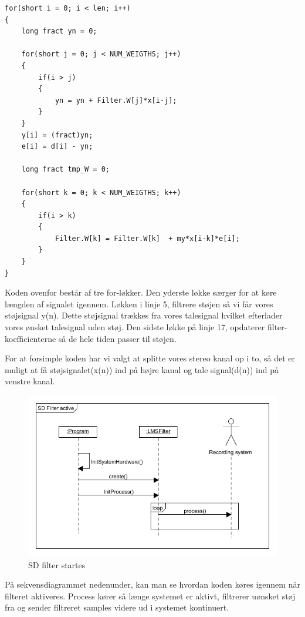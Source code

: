 \newpage


\begin{lstlisting}
for(short i = 0; i < len; i++)
{
	long fract yn = 0;

	for(short j = 0; j < NUM_WEIGTHS; j++)
	{
		if(i > j)
		{
			yn = yn + Filter.W[j]*x[i-j];
		}
	}
	y[i] = (fract)yn;
	e[i] = d[i] - yn;
		
	long fract tmp_W = 0;
		
	for(short k = 0; k < NUM_WEIGTHS; k++)
	{
		if(i > k)
		{
			Filter.W[k] = Filter.W[k]  + my*x[i-k]*e[i];
		}
	}
}
\end{lstlisting}

Koden ovenfor består af tre for-løkker. Den yderste løkke særger for at køre længden af signalet igennem. Løkken i linje 5, filtrere støjen så vi får vores støjsignal y(n). Dette støjsignal trækkes fra vores talesignal hvilket efterlader vores ønsket talesignal uden støj. Den sidste løkke på linje 17, opdaterer filter-koefficienterne så de hele tiden passer til støjen.

For at forsimple koden har vi valgt at splitte vores stereo kanal op i to, så det er muligt at få støjsignalet(x(n)) ind på højre kanal og tale signal(d(n)) ind på venstre kanal.


\begin{figure}[H]
	\centering
	\includegraphics[width = 400pt]{Img/SD_filter_active.png}
	\caption{SD filter startes}
	\label{fig:SD}
\end{figure}
På sekvensdiagrammet nedenunder, kan man se hvordan koden køres igennem når filteret aktiveres. Process kører så længe systemet er aktivt, filtrerer uønsket støj fra og sender filtreret samples videre ud i systemet kontinuert.
